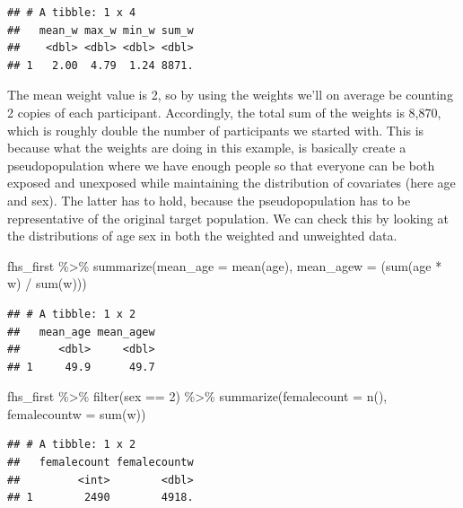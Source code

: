 \documentclass[
]{book}
\newenvironment{Shaded}{\begin{snugshade}}{\end{snugshade}}
\newcommand{\AttributeTok}[1]{\textcolor[rgb]{0.77,0.63,0.00}{#1}}
\newcommand{\DecValTok}[1]{\textcolor[rgb]{0.00,0.00,0.81}{#1}}
\newcommand{\FunctionTok}[1]{\textcolor[rgb]{0.00,0.00,0.00}{#1}}
\newcommand{\NormalTok}[1]{#1}
\newcommand{\SpecialCharTok}[1]{\textcolor[rgb]{0.00,0.00,0.00}{#1}}
\begin{document}
\begin{verbatim}
## # A tibble: 1 x 4
##   mean_w max_w min_w sum_w
##    <dbl> <dbl> <dbl> <dbl>
## 1   2.00  4.79  1.24 8871.
\end{verbatim}

The mean weight value is 2, so by using the weights we'll on average be counting 2 copies of each participant. Accordingly, the total sum of the weights is 8,870, which is roughly double the number of participants we started with. This is because what the weights are doing in this example, is basically create a pseudopopulation where we have enough people so that everyone can be both exposed and unexposed while maintaining the distribution of covariates (here age and sex). The latter has to hold, because the pseudopopulation has to be representative of the original target population. We can check this by looking at the distributions of age sex in both the weighted and unweighted data.

\begin{Shaded}
\begin{Highlighting}[]
\NormalTok{fhs\_first }\SpecialCharTok{\%\textgreater{}\%}
  \FunctionTok{summarize}\NormalTok{(}\AttributeTok{mean\_age =} \FunctionTok{mean}\NormalTok{(age),}
            \AttributeTok{mean\_agew =}\NormalTok{ (}\FunctionTok{sum}\NormalTok{(age }\SpecialCharTok{*}\NormalTok{ w) }\SpecialCharTok{/} \FunctionTok{sum}\NormalTok{(w)))}
\end{Highlighting}
\end{Shaded}

\begin{verbatim}
## # A tibble: 1 x 2
##   mean_age mean_agew
##      <dbl>     <dbl>
## 1     49.9      49.7
\end{verbatim}

\begin{Shaded}
\begin{Highlighting}[]
\NormalTok{fhs\_first }\SpecialCharTok{\%\textgreater{}\%}
  \FunctionTok{filter}\NormalTok{(sex }\SpecialCharTok{==} \DecValTok{2}\NormalTok{) }\SpecialCharTok{\%\textgreater{}\%}
  \FunctionTok{summarize}\NormalTok{(}\AttributeTok{femalecount =} \FunctionTok{n}\NormalTok{(),}
            \AttributeTok{femalecountw =} \FunctionTok{sum}\NormalTok{(w))}
\end{Highlighting}
\end{Shaded}

\begin{verbatim}
## # A tibble: 1 x 2
##   femalecount femalecountw
##         <int>        <dbl>
## 1        2490        4918.
\end{verbatim}
\end{document}
